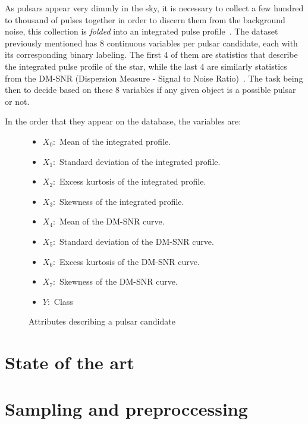 \documentclass[journal]{IEEEtran}
\begin{document}
As pulsars appear very dimmly in the sky, it is necessary to collect a few
hundred to thousand of pulses together in order to discern them from the
background noise, this collection is \textit{folded} into an integrated pulse
profile~\cite{pulsar:importance:kramer}. The dataset previously mentioned has 8
continuous variables per pulsar candidate, each with its corresponding binary
labeling. The first $4$ of them are statistics that describe the integrated
pulse profile of the star, while the last $4$ are similarly statistics from the
DM-SNR (Dispersion Measure - Signal to Noise
Ratio)~\cite{pulsar:dataset:explanation:lyon}. The task being then to decide
based on these 8 variables if any given object is a possible pulsar or not.

In the order that they appear on the database, the variables are:

\begin{figure}[ht]
    \begin{itemize}
        \item $X_0:$ Mean of the integrated profile.
        \item $X_1:$ Standard deviation of the integrated profile.
        \item $X_2:$ Excess kurtosis of the integrated profile.
        \item $X_3:$ Skewness of the integrated profile.
        \item $X_4:$ Mean of the DM-SNR curve.
        \item $X_5:$ Standard deviation of the DM-SNR curve.
        \item $X_6:$ Excess kurtosis of the DM-SNR curve.
        \item $X_7:$ Skewness of the DM-SNR curve.
        \item $Y:$ Class 
    \end{itemize}
    \caption{Attributes describing a pulsar candidate\label{fig:variables}}
\end{figure}


\section{State of the art\label{sec:state_of_art}}


\section{Sampling and preproccessing}
\end{document}
